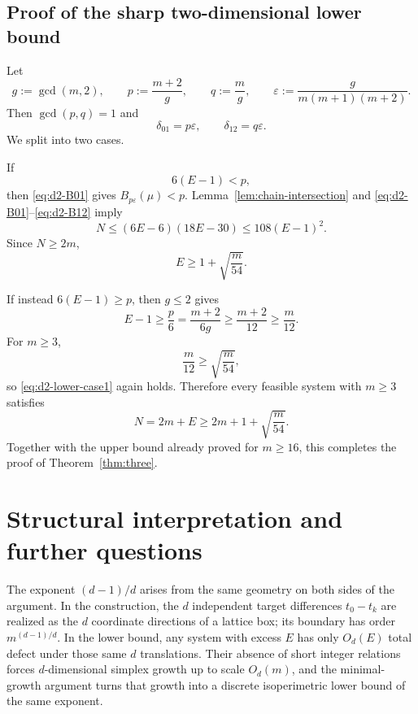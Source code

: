 \documentclass[11pt]{article}
\theoremstyle{definition}
\newcommand{\1}{\mathbf{1}}
\begin{document}
\subsection{Proof of the sharp two-dimensional lower bound}

Let
\begin{equation}\label{eq:d2-pqe}
  g:=\gcd(m,2),
  \qquad
  p:=\frac{m+2}{g},
  \qquad
  q:=\frac{m}{g},
  \qquad
  \varepsilon:=\frac{g}{m(m+1)(m+2)}.
\end{equation}
Then $\gcd(p,q)=1$ and
\[
  \delta_{01}=p\varepsilon,
  \qquad
  \delta_{12}=q\varepsilon.
\]
We split into two cases.

If
\begin{equation}\label{eq:d2-case1}
  6(E-1)<p,
\end{equation}
then \eqref{eq:d2-B01} gives $B_{p\varepsilon}(\mu)<p$.  Lemma~\ref{lem:chain-intersection} and \eqref{eq:d2-B01}--\eqref{eq:d2-B12} imply
\[
  N\le(6E-6)(18E-30)\le108(E-1)^2.
\]
Since $N\ge2m$,
\begin{equation}\label{eq:d2-lower-case1}
  E\ge1+\sqrt{\frac{m}{54}}.
\end{equation}

If instead $6(E-1)\ge p$, then $g\le2$ gives
\[
  E-1\ge\frac p6
  =\frac{m+2}{6g}
  \ge\frac{m+2}{12}
  \ge\frac m{12}.
\]
For $m\ge3$,
\[
  \frac m{12}\ge\sqrt{\frac m{54}},
\]
so \eqref{eq:d2-lower-case1} again holds.  Therefore every feasible system with $m\ge3$ satisfies
\[
  N=2m+E\ge2m+1+\sqrt{\frac m{54}}.
\]
Together with the upper bound already proved for $m\ge16$, this completes the proof of Theorem~\ref{thm:three}.

\section{Structural interpretation and further questions}

The exponent $(d-1)/d$ arises from the same geometry on both sides of the argument.  In the construction, the $d$ independent target differences $t_0-t_k$ are realized as the $d$ coordinate directions of a lattice box; its boundary has order $m^{(d-1)/d}$.  In the lower bound, any system with excess $E$ has only $O_d(E)$ total defect under those same $d$ translations.  Their absence of short integer relations forces $d$-dimensional simplex growth up to scale $O_d(m)$, and the minimal-growth argument turns that growth into a discrete isoperimetric lower bound of the same exponent.
\end{document}

